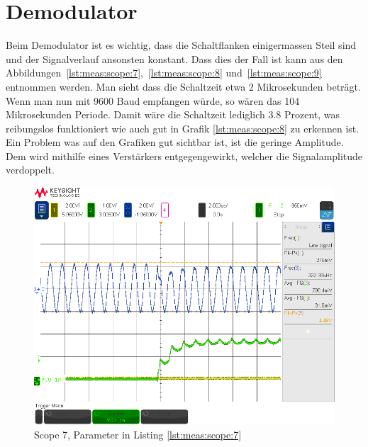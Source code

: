 \section{Demodulator}
\label{sec:val:demodulator}

Beim  Demodulator  ist  es   wichtig,  dass  die  Schaltflanken  einigermassen
Steil  sind und  der Signalverlauf  ansonsten  konstant.  Dass  dies der  Fall
ist  kann  aus den  Abbildungen~\ref{lst:meas:scope:7},~\ref{lst:meas:scope:8}
und~\ref{lst:meas:scope:9} entnommen  werden.  Man  sieht dass  die Schaltzeit
etwa 2 Mikrosekunden betr\"agt. Wenn man  nun mit 9600 Baud empfangen w\"urde,
so  w\"aren  das  104   Mikrosekunden  Periode. Damit  w\"are  die  Schaltzeit
lediglich 3.8  Prozent, was  reibungslos funktioniert wie  auch gut  in Grafik
\ref{lst:meas:scope:8} zu erkennen ist.  Ein  Problem was auf den Grafiken gut
sichtbar ist, ist die geringe Amplitude. Dem wird mithilfe eines Verst\"arkers
entgegengewirkt, welcher die Signalamplitude verdoppelt.

\begin{figure}[h!tb]
    \centering
    \includegraphics[width=1\textwidth, trim=0mm 21mm 0mm 11mm, clip]{images/scopeShots/scope_7b.png}
    \caption{Scope 7, Parameter in Listing \ref{lst:meas:scope:7}}
    \label{fig:meas:scope:7}
\end{figure}

